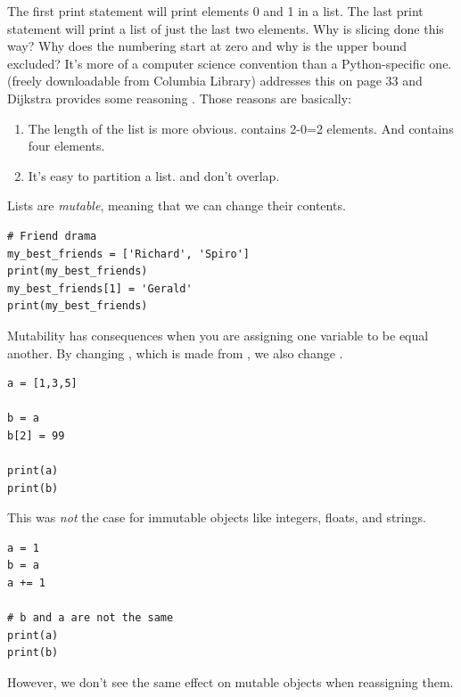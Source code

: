 \noindent The first print statement will print elements 0 and 1 in a list. The last print statement will print a list of just the last two elements. Why is slicing done this way? Why does the numbering start at zero and why is the upper bound excluded? It's more of a computer science convention than a Python-specific one. \cite{ramalho2015fluent} (freely downloadable from Columbia Library) addresses this on page 33 and Dijkstra provides some reasoning . Those reasons are basically:
\begin{enumerate}
    \item The length of the list is more obvious.  contains 2-0=2 elements. And  contains four elements. 
    \item It's easy to partition a list.  and  don't overlap. 
\end{enumerate}



\bigskip

\noindent Lists are \emph{mutable}, meaning that we can change their contents.

\begin{lstlisting}
# Friend drama
my_best_friends = ['Richard', 'Spiro']
print(my_best_friends)
my_best_friends[1] = 'Gerald'
print(my_best_friends)
\end{lstlisting}


Mutability has consequences when you are assigning one variable to be equal another. By changing , which is made from , we also change . 

\begin{lstlisting}
a = [1,3,5]

b = a
b[2] = 99

print(a)
print(b)
\end{lstlisting}

This was \emph{not} the case for immutable objects like integers, floats, and strings. 

\begin{lstlisting}
a = 1
b = a
a += 1

# b and a are not the same
print(a)
print(b)
\end{lstlisting}



However, we don't see the same effect on mutable objects when reassigning them. 

